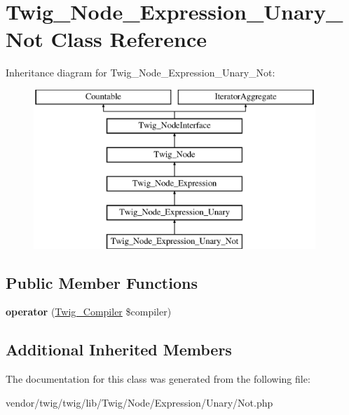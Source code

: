 \hypertarget{classTwig__Node__Expression__Unary__Not}{}\section{Twig\+\_\+\+Node\+\_\+\+Expression\+\_\+\+Unary\+\_\+\+Not Class Reference}
\label{classTwig__Node__Expression__Unary__Not}
Inheritance diagram for Twig\+\_\+\+Node\+\_\+\+Expression\+\_\+\+Unary\+\_\+\+Not\+:\begin{figure}[H]
\begin{center}
\leavevmode
\includegraphics[height=6.000000cm]{classTwig__Node__Expression__Unary__Not}
\end{center}
\end{figure}
\subsection*{Public Member Functions}
\begin{DoxyCompactItemize}
\item 
{\bfseries operator} (\hyperlink{classTwig__Compiler}{Twig\+\_\+\+Compiler} \$compiler)\hypertarget{classTwig__Node__Expression__Unary__Not_a04e943a0d83d62d12c08bcbe6a095c43}{}\label{classTwig__Node__Expression__Unary__Not_a04e943a0d83d62d12c08bcbe6a095c43}

\end{DoxyCompactItemize}
\subsection*{Additional Inherited Members}


The documentation for this class was generated from the following file\+:\begin{DoxyCompactItemize}
\item 
vendor/twig/twig/lib/\+Twig/\+Node/\+Expression/\+Unary/Not.\+php\end{DoxyCompactItemize}
